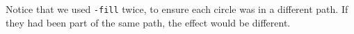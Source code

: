 \documentclass{book}
\begin{document}
\bigskip
\ifdefined\HCode
{}
\else
{}
\fi
\bigskip

\noindent Notice that we used \texttt{-fill} twice, to ensure each circle was in a different path. If they had been part of the same path, the effect would be different.
\end{document}
